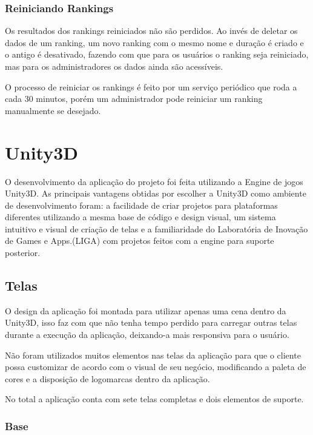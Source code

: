 \subsubsection{Reiniciando Rankings}
\label{subsubsec:reiniciando}

Os resultados dos rankings reiniciados não são perdidos. Ao invés de deletar os dados de um ranking, um novo ranking com o mesmo nome e duração é criado e o antigo é desativado, fazendo com que para os usuários o ranking seja reiniciado, mas para os administradores os dados ainda são acessíveis.

O processo de reiniciar os rankings é feito por um serviço periódico que roda a cada 30 minutos, porém um administrador pode reiniciar um ranking manualmente se desejado.

\section{Unity3D}
\label{sec:unity3d}

O desenvolvimento da aplicação do projeto foi feita utilizando a Engine de jogos Unity3D. As principais vantagens obtidas por escolher a Unity3D como ambiente de desenvolvimento foram: a facilidade de criar projetos
para plataformas diferentes utilizando a mesma base de código e design visual, um sistema intuitivo e visual de criação de telas e a familiaridade do Laboratória de Inovação de Games e Apps.(LIGA) com projetos feitos com a engine para suporte posterior.

\subsection{Telas}
\label{subsec:telas}

O design da aplicação foi montada para utilizar apenas uma cena dentro da Unity3D, isso faz com que não tenha tempo perdido para carregar outras telas durante a execução da aplicação, deixando-a mais responsiva para o usuário.

Não foram utilizados muitos elementos nas telas da aplicação para que o cliente possa customizar de acordo com o visual de seu negócio, modificando a paleta de cores e a disposição de logomarcas dentro da aplicação.

No total a aplicação conta com sete telas completas e dois elementos de suporte.

\subsubsection{Base}
\label{subsubsec:base}

